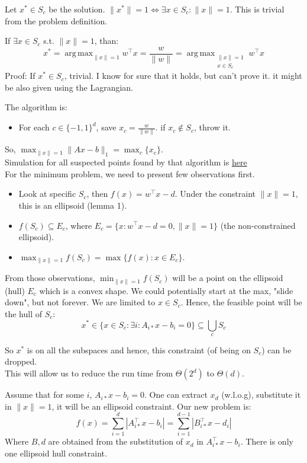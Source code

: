 \documentclass[12pt, a4paper]{article}
\DeclareMathOperator*{\argmax}{arg\,max}
\newcommand{\norm}[1]{\lVert #1 \rVert}
\begin{document}
Let $x^*\in S_c$ be the solution. $\norm{x^*}=1\Longleftrightarrow \exists x\in S_c: \norm{x}=1$. This is trivial from the problem definition. 

If $\exists x\in S_c$ s.t. $\norm{x}=1$, than:
\[x^*=\argmax_{\norm{x}=1} w^\top x=\frac{w}{\norm{w}}=\argmax_{
\substack{\norm{x}=1 \\ 
x\in S_c}} w^\top x\]
Proof: 
If $x^* \in S_c$, trivial. I know for sure that it holds, but can't prove it. it might be also given using the Lagrangian. 

The algorithm is:
\begin{itemize}
    \item For each $c\in\{-1,1\}^d$, save $x_c=\frac{w}{\norm{w}}$. if $x_c\notin S_c$, throw it.
\end{itemize}
So, $\max_{\norm{x}=1} \norm{Ax-b}_1=\max_c \{x_c\}$.\\
Simulation for all suspected points found by that algorithm is \href{https://www.desmos.com/3d/83e70a9d48}{here}\\

For the minimum problem, we need to present few observations first. 
\begin{itemize}
    \item Look at specific $S_c$, then $f(x)=w^\top x - d$. Under the constraint $\norm{x}=1$, this is an ellipsoid (lemma 1).
    \item $f(S_c)\subseteq E_c$, where $E_c=\{x: w^\top x-d=0, \norm{x}=1\}$ (the non-constrained ellipsoid).
    \item $\max_{\norm{x}=1} f(S_c)=\max \{f(x): x\in E_c\}$.
\end{itemize}

From those observations, $\min_{\norm{x}=1} f(S_c)$ will be a point on the ellipsoid (hull) $E_c$ which is a convex shape. We could potentially start at the max, "slide down", but not forever. We are limited to $x\in S_c$. Hence, the feasible point will be the hull of $S_c$:
\[x^*\in \{x\in S_c: \exists i: A_{i*}x-b_i=0\}\subseteq \bigcup_{c} S_c\]

So $x^*$ is on all the subspaces and hence, this constraint (of being on $S_c$) can be dropped. \\
This will allow us to reduce the run time from $\Theta(2^d)$ to $\Theta(d)$.

Assume that for some $i$, $A_{i*}x-b_i=0$. One can extract $x_d$ (w.l.o.g), substitute it in $\norm{x}=1$, it will be an ellipsoid constraint. Our new problem is:
\[f(x)=\sum_{i=1}^d |A_{i*}^\top x-b_i|=\sum_{i=1}^{d-1} |B_{i*}^\top x-d_i|\]
Where $B,d$ are obtained from the substitution of $x_d$ in $A_{i*}^\top x-b_i$. There is only one ellipsoid hull constraint.
\end{document}
